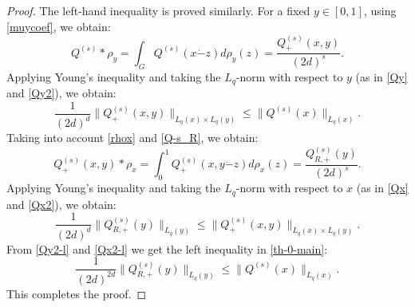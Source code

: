 \documentclass[12pt]{article}
\begin{document}
\begin{proof}
        The left-hand inequality is proved similarly. For a fixed $y \in [0,1]$, using \eqref{muycoef}, we obtain:  
		\[
		Q^{(s)} * \rho_y = \int_{G} Q^{(s)} (x\dot-z) d\rho_y(z) = \frac{Q^{(s)}_{+}(x,y)}{(2d)^s}.
		\]
Applying Young's inequality and taking the $L_q$-norm with respect to $y$ (as in \eqref{Qy} and \eqref{Qy2}), we obtain:
		\begin{equation} \label{Qy2-l}
			\frac{1}{(2d)^d}\|Q^{(s)}_{+}(x,y)\|_{L_q(x)\times L_q(y)} \le \|Q^{(s)} (x)\|_{L_q(x)}.
		\end{equation}
		Taking into account \eqref{rhox} and \eqref{Q-s_R}, we obtain:
		\[
		Q^{(s)}_{+}(x,y) * \rho_x = \int_0^1 Q^{(s)}_{+} (x, y \dot-z)d\rho_x(z) = \frac{Q^{(s)}_{R, +}(y)}{(2d)^s}.
		\]
		Applying Young's inequality and taking the $L_q$-norm with respect to $x$ (as in \eqref{Qx} and \eqref{Qx2}), we obtain:
		\begin{equation} \label{Qx2-l}
			\frac{1}{(2d)^{d}} \|Q^{(s)}_{R,+}(y)\|_{L_q(y)}  \le  \|Q^{(s)}_{+}(x,y)\|_{L_q(x)\times L_q(y)}.
		\end{equation}
		From \eqref{Qy2-l} and \eqref{Qx2-l} we get the left inequality in \eqref{th-0-main}:
		\[
		\frac{1}{(2d)^{2d}} \|Q^{(s)}_{R,+}(y)\|_{L_q(y)} \le \|Q^{(s)} (x)\|_{L_q(x)}.
		\]	 
		This completes the proof.
	\end{proof}
\end{document}
